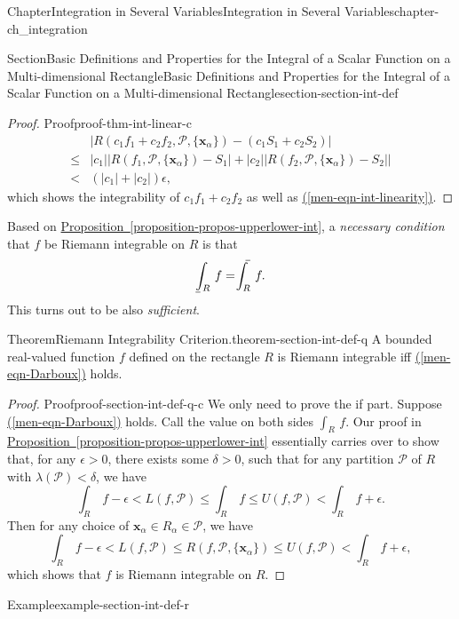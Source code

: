 \documentclass[oneside,10pt,]{book}
\makeatletter
\newcommand{\xreffont}{\relax}
\numberwithin{equation}{section}
\newcommand{\bx}{\mathbf{x}}
\newcommand{\cP}{\mathcal{P}}
\def\upint{\mathchoice
    {\mkern10mu\overline{\vphantom{\intop}\mkern7mu}\mkern-24mu}
    {\mkern7mu\overline{\vphantom{\intop}\mkern7mu}\mkern-14mu}
    {\mkern7mu\overline{\vphantom{\intop}\mkern7mu}\mkern-14mu}
    {\mkern7mu\overline{\vphantom{\intop}\mkern7mu}\mkern-14mu}
  \int}
\def\lowint{\relax\if@display
 \mkern3mu\underline{\vphantom{\intop}\mkern7mu}\mkern-10mu\int
\else 
\underline{\vphantom{\int}\mkern7mu}\mkern-10mu\int
\fi}
\newcommand{\amp}{&}
\makeatother
\begin{document}
\begin{chapterptx}{Chapter}{Integration in Several Variables}{}{Integration in Several Variables}{}{}{chapter-ch_integration}
\begin{sectionptx}{Section}{Basic Definitions and Properties for the Integral of a Scalar Function on a Multi-dimensional Rectangle}{}{Basic Definitions and Properties for the Integral of a Scalar Function on a Multi-dimensional Rectangle}{}{}{section-section-int-def}
\begin{proof}{Proof}{}{proof-thm-int-linear-c}
\begin{align*}
\amp \vert R(c_{1}f_{1}+c_{2}f_{2}, \cP, \{\bx_{\alpha}\}) -
\left(c_{1}S_{1}+c_{2 }S_{2} \right)\vert \\
\le \amp |c_{1}| \vert R(f_{1}, \cP, \{\bx_{\alpha}\}) -S_{1}\vert
+ |c_{2}| \vert R(f_{2}, \cP, \{\bx_{\alpha}\}) -S_{2}\vert
\vert \\
< \amp \left(|c_{1}|+|c_{2}| \right) \epsilon,
\end{align*}
which shows the integrability of \(c_{1}f_{1}+c_{2}f_{2}\) as well as \hyperref[men-eqn-int-linearity]{({\xreffont\ref{men-eqn-int-linearity}})}.%
\end{proof}
Based on  \hyperref[proposition-propos-upperlower-int]{Proposition~{\xreffont\ref{proposition-propos-upperlower-int}}}, a \emph{necessary condition} that \(f \) be Riemann integrable on \(R\) is that%
\begin{equation}
\lowint_{R} \, f  =\upint_{R}\, f.\label{men-eqn-Darboux}
\end{equation}
This turns out to be also \emph{sufficient}.%
\begin{theorem}{Theorem}{Riemann Integrability Criterion.}{}{theorem-section-int-def-q}%
A bounded real-valued function \(f\) defined on the rectangle \(R\) is Riemann integrable iff \hyperref[men-eqn-Darboux]{({\xreffont\ref{men-eqn-Darboux}})} holds.\end{theorem}
\begin{proof}{Proof}{}{proof-section-int-def-q-c}
We only need to prove the if part. Suppose \hyperref[men-eqn-Darboux]{({\xreffont\ref{men-eqn-Darboux}})} holds. Call the value on both sides \(\int_{R}\, f\). Our proof in  \hyperref[proposition-propos-upperlower-int]{Proposition~{\xreffont\ref{proposition-propos-upperlower-int}}} essentially carries over to show that, for any \(\epsilon >0\), there exists some \(\delta >0\), such that for any partition \(\cP\) of \(R\) with \(\lambda(\cP) < \delta\), we have%
\begin{equation*}
\int_{R}\, f-\epsilon < L(f, \cP) \le \int_{R}\, f \le U(f, \cP) < \int_{R}\, f +\epsilon.
\end{equation*}
Then for any choice of \(\bx_{\alpha}\in R_{\alpha}\in \cP\), we have%
\begin{equation*}
\int_{R}\, f-\epsilon < L(f, \cP) \le R(f, \cP, \{\bx_{\alpha}\})\le U(f, \cP) < \int_{R}\, f +\epsilon,
\end{equation*}
which shows that \(f\) is Riemann integrable on \(R\).\end{proof}
\begin{example}{Example}{}{example-section-int-def-r}%

\end{example}
\end{sectionptx}
\end{chapterptx}
\end{document}
